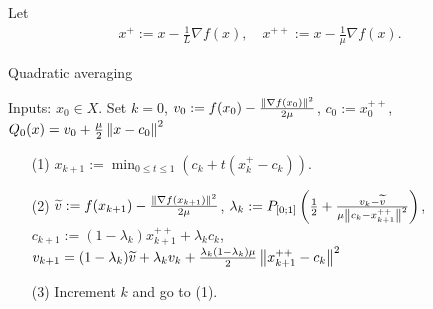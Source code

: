 \documentclass[12pt,english]{article}
\begin{document}
%
Let
%
\begin{align*}
x^+ := x - \frac{1}{L}\nabla f(x),\quad x^{++} := x - \frac{1}{\mu}\nabla f(x).
\end{align*}
%
%
\begin{yellow}
\begin{algorithm}[H]
\caption{Quadratic averaging} 
\label{algorithm:QA} 
%
Inputs: $x_0\in X$. Set $k=0$, $v_0:= f(x_0)-\frac{\left\|\nabla f(x_0)\right\|^2}{2\mu}$, $c_0:=x_0^{++}$, $Q_0(x) = v_0 + \frac{\mu}{2}\left\|x-c_0\right\|^2$
%
\begin{itemize}
\item[(1)] $x_{k+1} := \min_{0\le t\le 1} (c_k + t(x_k^{+}-c_k))$.
\item[(2)] 
$\widetilde{v}:= f(x_{k+1}) - \frac{\left\|\nabla f(x_{k+1})\right\|^2}{2\mu}$,\quad 
$\lambda_{k}:=P_{[0;1]}\left(\frac12 + \frac{v_k-\widetilde{v}}{\mu\left\|c_k-x_{k+1}^{++}\right\|^2}\right)$,\quad $c_{k+1} := (1-\lambda_k)x_{k+1}^{++} + \lambda_k c_k$,\quad $v_{k+1} = (1-\lambda_k)\widetilde{v}+\lambda_k v_k + \frac{\lambda_k(1-\lambda_k)\mu}{2}\left\|x_{k+1}^{++}-c_k\right\|^2$
\item[(3)] Increment $k$ and go to (1).
\end{itemize}
%
\end{algorithm}
\end{yellow}
\end{document}

